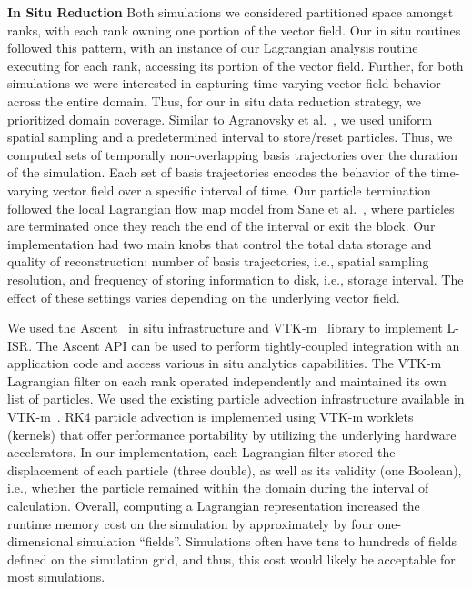 \documentclass[runningheads]{llncs}
\begin{document}
\noindent\textbf{In Situ Reduction}
%
Both simulations we considered partitioned space amongst ranks,
with each rank owning one portion of the vector field.
Our in situ routines followed this pattern, with an
instance of our Lagrangian analysis
routine executing for each rank, accessing its portion
of the vector field.
%
Further, for both simulations we were interested in capturing time-varying vector field behavior across the entire domain.
%
Thus, for our in situ data reduction strategy, we prioritized domain coverage.
%
Similar to Agranovsky et al.~\cite{agranovsky2014improved}, we used uniform spatial sampling and a predetermined interval to store/reset particles.
%
Thus, we computed sets of temporally non-overlapping basis trajectories over the duration of the simulation.
%
Each set of basis trajectories encodes the behavior of the time-varying vector field over a specific interval of time.
%
Our particle termination followed the local Lagrangian flow map model from Sane et al.~\cite{sane2020scalable}, where particles are terminated once they reach the end of the interval or exit the block.
%
Our implementation had two main knobs that control the total data storage and quality of reconstruction: number of basis trajectories, i.e., spatial sampling resolution, and frequency of storing information to disk, i.e., storage interval.
%
The effect of these settings varies depending on the underlying vector field.
%

We used the Ascent~\cite{Larsen2017Alpine} in situ infrastructure and VTK-m~\cite{moreland2016vtk} library to implement L-ISR.
%
The Ascent API can be used to perform tightly-coupled integration with an application code and access various in situ analytics capabilities.
The VTK-m Lagrangian filter on each rank operated independently and maintained its own list of particles.
%
We used the existing particle advection infrastructure available in VTK-m~\cite{pugmire2018performance}.
%
RK4 particle advection is implemented using VTK-m worklets (kernels) that offer performance portability by utilizing the underlying hardware accelerators.
%
In our implementation, each Lagrangian filter stored the displacement of each particle (three double), as well as its validity (one Boolean), i.e., whether the particle remained within the domain during the interval of calculation.
%
Overall, computing a Lagrangian representation increased the runtime memory cost on the simulation by approximately by four one-dimensional simulation ``fields''.
%
Simulations often have tens to hundreds of fields defined on the simulation grid, and thus, this cost would likely be acceptable for most simulations.
%
%
\end{document}
